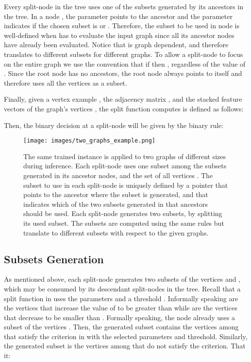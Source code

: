 Every split-node in the tree uses one of the subsets generated by its ancestors in the tree. In a node , the parameter  points to the ancestor and the parameter  indicates if the chosen subset is  or .
Therefore, the subset  to be used in node  is well-defined when  has to evaluate the input graph  since all its ancestor nodes have already been evaluated. 
Notice that  is graph dependent, and therefore translates to different subsets for different graphs. To allow a split-node to focus on the entire graph we use the convention that if  then , regardless of the value of . 
Since the root node has no ancestors, the root node always points to itself and therefore uses all the vertices as a subset.




Finally, given a vertex example , the adjacency matrix , and the stacked feature vectors of the graph's vertices , the split function \acronym computes is defined as follows:

Then, the binary decision at a split-node will be given by the binary rule:








 \begin{figure*}[t]
    \centering
   \texttt{[image: images/two\_graphs\_example.png]}
    \caption{The same trained \acronym instance is applied to two graphs of different sizes during inference. Each split-node uses one subset among the subsets generated in its ancestor nodes, and the set of all vertices . The subset to use in each split-node is uniquely defined by a pointer  that points to the ancestor where the subset is generated, and  that indicates which of the two subsets generated in that ancestors should be used. Each split-node generates two subsets, by splitting its used subset.
    The subsets are computed using the same rules but translate to different subsets with respect to the given graphs.
    }
        \label{Figure:attention}
    \end{figure*}

    
\subsection{Subsets Generation}\label{subsection:subset_generation}
As mentioned above, each split-node  generates two subsets of the vertices  and , which may be consumed by its descendant split-nodes in the tree.
Recall that a split function in  uses the parameters  and a threshold . 
Informally speaking  are the vertices that increase the value of  to be greater than  while  are the vertices that decrease  to be smaller than . Formally speaking, 
the node  already uses a subset of the vertices . 
Then, the generated subset  contains the vertices among  that satisfy the criterion in  with the selected parameters and threshold. Similarly, the generated subset  is the vertices among  that do not satisfy the criterion. That it:

